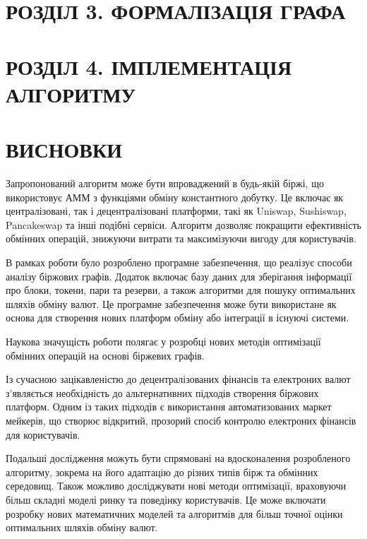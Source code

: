 \documentclass[14pt]{extarticle}
\begin{document}
\section{РОЗДІЛ 3. ФОРМАЛІЗАЦІЯ ГРАФА}\label{sec:graph}

\newpage

\section{РОЗДІЛ 4. ІМПЛЕМЕНТАЦІЯ АЛГОРИТМУ}\label{sec:algorithm-impl}

\newpage

\section*{ВИСНОВКИ}\label{sec:conclusions}

Запропонований алгоритм може бути впроваджений в будь-якій біржі, що
використовує АММ з функціями обміну константного добутку. Це включає як
централізовані, так і децентралізовані платформи, такі як Uniswap, Sushiswap,
Pancakeswap та інші подібні сервіси. Алгоритм дозволяє покращити ефективність
обмінних операцій, знижуючи витрати та максимізуючи вигоду для користувачів.

В рамках роботи було розроблено програмне забезпечення, що реалізує способи
аналізу біржових графів. Додаток включає базу даних для зберігання інформації про
блоки, токени, пари та резерви, а також алгоритми для пошуку оптимальних шляхів
обміну валют. Це програмне забезпечення може бути використане як основа для
створення нових платформ обміну або інтеграції в існуючі системи.

Наукова значущість роботи полягає у розробці нових методів оптимізації обмінних
операцій на основі біржевих графів.

Із сучасною зацікавленістю до децентралізованих фінансів та електроних валют
з'являється необхідність до альтернативних підходів створення біржових платформ.
Одним із таких підходів є використання автоматизованих маркет мейкерів, що
створює відкритий, прозорий спосіб контролю електроних фінансів для
користувачів.

Подальші дослідження можуть бути спрямовані на вдосконалення розробленого
алгоритму, зокрема на його адаптацію до різних типів бірж та обмінних середовищ.
Також можливо досліджувати нові методи оптимізації, враховуючи більш складні
моделі ринку та поведінку користувачів. Це може включати розробку нових
математичних моделей та алгоритмів для більш точної оцінки оптимальних шляхів
обміну валют.
\end{document}
